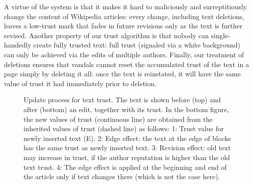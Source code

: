 %
A virtue of the system is that it makes it hard to maliciously
and surreptitiously change the content of Wikipedia articles: every
change, including text deletions, leaves a low-trust mark that fades
in future revisions only as the text is further revised.
Another property of our trust algorithm is that nobody can
single-handedly create fully trusted text: full trust (signaled via a
white background) can only be achieved via the edits of multiple
authors.
Finally, our treatment of deletions ensures that vandals cannot
reset the accumulated trust of the text in a page simply by deleting
it all: once the text is reinstated, it will have the same value of
trust it had immediately prior to deletion.


\begin{figure}[t]
\centering
{}
\caption{Update process for text trust.
  The text is shown before (top) and after (bottom) an edit, together
  with its trust.
  In the bottom figure, the new values of trust (continuous line) are
  obtained from the inherited values of trust (dashed line) as follows:
  1: Trust value for newly inserted text (E).
  2: Edge effect: the text at the edge of blocks has the same trust as
  newly inserted text.
  3: Revision effect: old text may increase in trust, if the author
  reputation is higher than the old text trust.
  4: The edge effect is applied at the beginning and end of the
  article only if text changes there (which is not the case here).}
\label{fig-trust-update}
\end{figure}


